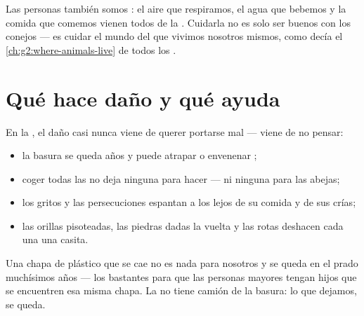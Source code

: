 \begin{remark}\label{rem:g2:caring-for-nature:part}
Las personas también somos : el aire que respiramos, el
agua que bebemos y la comida que comemos vienen todos de la
. Cuidarla no es solo ser buenos con los conejos --- es
cuidar el mundo del que vivimos nosotros mismos, como decía el
\cref{ch:g2:where-animals-live} de todos los .
\end{remark}

\section{Qué hace daño y qué ayuda}

\begin{proposition}\label{prop:g2:caring-for-nature:harm}
En la , el daño casi nunca viene de querer portarse mal ---
viene de no pensar:
\begin{itemize}
  \item la basura se queda años y puede atrapar o envenenar ;
  \item coger todas las  no deja ninguna para hacer  ---
        ni ninguna para las abejas;
  \item los gritos y las persecuciones espantan a los  lejos de
        su comida y de sus crías;
  \item las orillas pisoteadas, las piedras dadas la vuelta y las 
        rotas deshacen cada una una casita.
\end{itemize}
\end{proposition}
\admitted

\begin{example}\label{ex:g2:caring-for-nature:cap}
Una chapa de plástico que se cae no es nada para nosotros y se queda
en el prado muchísimos años --- los bastantes para que las personas
mayores tengan hijos que se encuentren esa misma chapa. La 
no tiene camión de la basura: lo que dejamos, se queda.
\end{example}

